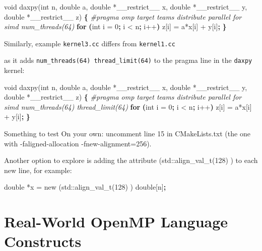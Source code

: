 \documentclass[
]{article}
\let\oldtexttt\texttt
\renewcommand{\texttt}[1]{
  \colorbox{Light}{\oldtexttt{#1}}
}
\newenvironment{Shaded}{}{}
\newcommand{\CommentTok}[1]{\textcolor[rgb]{0.38,0.63,0.69}{\textit{#1}}}
\newcommand{\ExtensionTok}[1]{#1}
\newcommand{\KeywordTok}[1]{\textcolor[rgb]{0.00,0.44,0.13}{\textbf{#1}}}
\newcommand{\NormalTok}[1]{#1}
\newcommand{\OperatorTok}[1]{\textcolor[rgb]{0.40,0.40,0.40}{#1}}
\begin{document}
\begin{Shaded}
\begin{Highlighting}[]
\ExtensionTok{void}\NormalTok{ daxpy(int n, double a, double *\_\_restrict\_\_ x, double *\_\_restrict\_\_ y, double *\_\_restrict\_\_ z)}
\KeywordTok{\{}
\CommentTok{\#pragma omp target teams distribute parallel for simd num\_threads(64)}
        \KeywordTok{for} \KeywordTok{(}\ExtensionTok{int}\NormalTok{ i = 0}\KeywordTok{;} \ExtensionTok{i} \OperatorTok{\textless{}}\NormalTok{ n}\KeywordTok{;} \ExtensionTok{i++}\KeywordTok{)}
                \ExtensionTok{z}\NormalTok{[i] = a*x[i] + y[i]}\KeywordTok{;}
\KeywordTok{\}}
\end{Highlighting}
\end{Shaded}

Similarly, example \texttt{kernel3.cc} differs from \texttt{kernel1.cc}
as it adds \texttt{num\_threads(64)\ thread\_limit(64)} to the pragma
line in the \texttt{daxpy} kernel:

\begin{Shaded}
\begin{Highlighting}[]
\ExtensionTok{void}\NormalTok{ daxpy(int n, double a, double *\_\_restrict\_\_ x, double *\_\_restrict\_\_ y, double *\_\_restrict\_\_ z)}
\KeywordTok{\{}
\CommentTok{\#pragma omp target teams distribute parallel for simd num\_threads(64) thread\_limit(64)}
        \KeywordTok{for} \KeywordTok{(}\ExtensionTok{int}\NormalTok{ i = 0}\KeywordTok{;} \ExtensionTok{i} \OperatorTok{\textless{}}\NormalTok{ n}\KeywordTok{;} \ExtensionTok{i++}\KeywordTok{)}
                \ExtensionTok{z}\NormalTok{[i] = a*x[i] + y[i]}\KeywordTok{;}
\KeywordTok{\}}
\end{Highlighting}
\end{Shaded}

Something to test On your own: uncomment line 15 in CMakeLists.txt (the
one with -faligned-allocation -fnew-alignment=256).

Another option to explore is adding the attribute
(std::align\_val\_t(128) ) to each new line, for example:

\begin{Shaded}
\begin{Highlighting}[]
\ExtensionTok{double}\NormalTok{ *x = new (std::align\_val\_t(128) ) }\ExtensionTok{double}\NormalTok{[n]}\KeywordTok{;}
\end{Highlighting}
\end{Shaded}

\hypertarget{real-world-openmp-language-constructs}{%
\section{Real-World OpenMP Language
Constructs}\label{real-world-openmp-language-constructs}}
\end{document}
